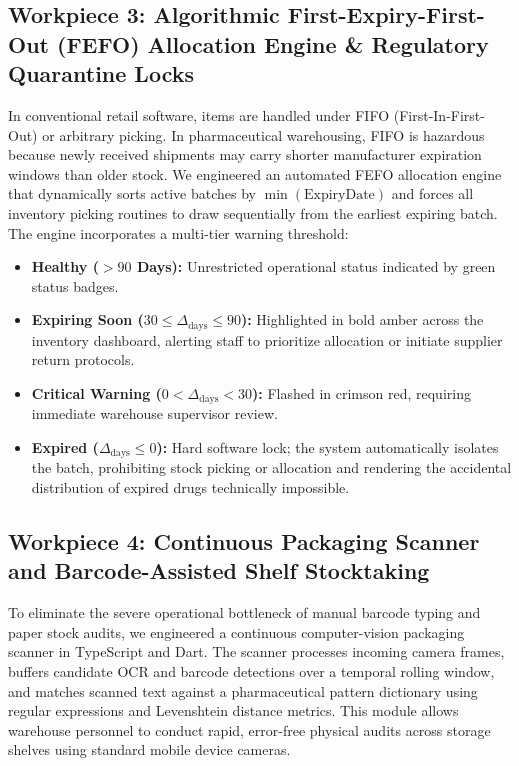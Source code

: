 \subsection{Workpiece 3: Algorithmic First-Expiry-First-Out (FEFO) Allocation Engine \& Regulatory Quarantine Locks}
In conventional retail software, items are handled under FIFO (First-In-First-Out) or arbitrary picking. In pharmaceutical warehousing, FIFO is hazardous because newly received shipments may carry shorter manufacturer expiration windows than older stock. We engineered an automated FEFO allocation engine that dynamically sorts active batches by $\min(\text{ExpiryDate})$ and forces all inventory picking routines to draw sequentially from the earliest expiring batch. The engine incorporates a multi-tier warning threshold:
\begin{itemize}
    \item \textbf{Healthy ($> 90$ Days):} Unrestricted operational status indicated by green status badges.
    \item \textbf{Expiring Soon ($30 \le \Delta_{\text{days}} \le 90$):} Highlighted in bold amber across the inventory dashboard, alerting staff to prioritize allocation or initiate supplier return protocols.
    \item \textbf{Critical Warning ($0 < \Delta_{\text{days}} < 30$):} Flashed in crimson red, requiring immediate warehouse supervisor review.
    \item \textbf{Expired ($\Delta_{\text{days}} \le 0$):} Hard software lock; the system automatically isolates the batch, prohibiting stock picking or allocation and rendering the accidental distribution of expired drugs technically impossible.
\end{itemize}

\subsection{Workpiece 4: Continuous Packaging Scanner and Barcode-Assisted Shelf Stocktaking}
To eliminate the severe operational bottleneck of manual barcode typing and paper stock audits, we engineered a continuous computer-vision packaging scanner in TypeScript and Dart. The scanner processes incoming camera frames, buffers candidate OCR and barcode detections over a temporal rolling window, and matches scanned text against a pharmaceutical pattern dictionary using regular expressions and Levenshtein distance metrics. This module allows warehouse personnel to conduct rapid, error-free physical audits across storage shelves using standard mobile device cameras.

